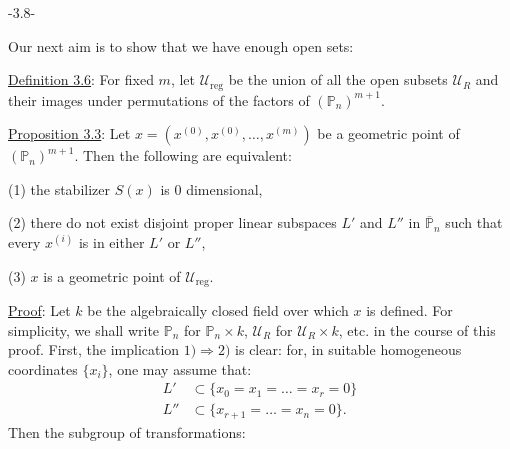 \begin{center}-3.8-\end{center}
Our next aim is to show that we have enough open sets:

\uline{Definition 3.6}: For fixed $m$, let $\mathcal U_{\mathrm{reg}}$ be the union of all the open subsets $\mathcal U_R$ and their images under permutations of the factors of $(\mathbb{P}_n)^{m+1}$.

\uline{Proposition 3.3}: Let $x=(x^{(0)},x^{(0)},\ldots,x^{(m)})$ be a geometric point of $(\mathbb{P}_n)^{m+1}$. Then the following are equivalent:

(1) the stabilizer $S(x)$ is $0$ dimensional,

(2) there do not exist disjoint proper linear subspaces $L'$ and $L''$ in $\overline{\mathbb{P}}_n$ such that every $x^{(i)}$ is in either $L'$ or $L''$,

(3) $x$ is a geometric point of $\mathcal U_{\mathrm{reg}}$.

\uline{Proof}: Let $k$ be the algebraically closed field over which $x$ is defined. For simplicity, we shall write $\mathbb{P}_n$ for $\mathbb{P}_n\times k$, $\mathcal U_R$ for $\mathcal U_R\times k$, etc. in the course of this proof. First, the implication $1)\Rightarrow 2)$ is clear: for, in suitable homogeneous coordinates $\{x_i\}$, one may assume that:
\[
\begin{aligned}
L'&\subset\{x_0=x_1=\ldots=x_r=0\}\\
L''&\subset\{x_{r+1}=\ldots=x_n=0\}.
\end{aligned}
\]
Then the subgroup of transformations:
